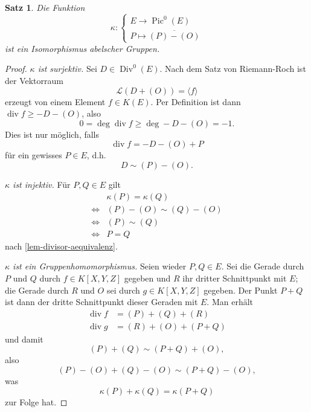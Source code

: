 \documentclass{amsart}
\theoremstyle{plain}
\newtheorem{proposition}[subsection]{Satz}
\theoremstyle{definition}
\newcommand{\pic}{\operatorname{Pic}}
\newcommand{\divgrp}{\operatorname{Div}}
\newcommand{\divop}{\operatorname{div}}
\newcommand{\riemannspace}{\mathcal{L}}
\newcommand{\coset}[1]{\overline{#1}}
\begin{document}
\begin{proposition}
	\label{prop-isomorphism-pic}
	Die Funktion
	\begin{equation*}
		\kappa \colon \begin{cases}
			E \rightarrow \pic^0(E) \\
			P \mapsto \coset{(P) - (O)}
		\end{cases}
	\end{equation*}
	ist ein Isomorphismus abelscher Gruppen.
\end{proposition}
\begin{proof}
	{\it $\kappa$ ist surjektiv.}
	Sei $D \in \divgrp^0(E)$. Nach dem Satz von Riemann-Roch ist der Vektorraum
	\begin{equation*}
		\riemannspace(D + (O)) = \langle f \rangle
	\end{equation*}
	erzeugt von einem Element $f \in K(E)$. Per Definition ist dann $\divop f \geq -D - (O)$, also
	\begin{equation*}
		0 = \deg \divop f \geq \deg -D - (O) = -1.
	\end{equation*}
	Dies ist nur möglich, falls
	\begin{equation*}
		\divop f = -D - (O) + P
	\end{equation*}
	für ein gewisses $P \in E$, d.h.
	\begin{equation*}
		D \sim (P) - (O).
	\end{equation*}

	{\it $\kappa$ ist injektiv.}
	Für $P, Q \in E$ gilt
	\begin{equation*}
		\begin{array}{ll}
			& \kappa(P) = \kappa(Q) \\
			\Leftrightarrow & (P) - (O) \sim (Q) - (O) \\
			\Leftrightarrow & (P) \sim (Q) \\
			\Leftrightarrow & P = Q
		\end{array}
	\end{equation*}
	nach \ref{lem-divisor-aequivalenz}.

	{\it $\kappa$ ist ein Gruppenhomomorphismus.}
	Seien wieder $P, Q \in E$.
	Sei die Gerade durch $P$ und $Q$ durch $f \in K[X, Y, Z]$ gegeben und $R$ ihr dritter Schnittpunkt mit $E$; die Gerade durch $R$ und $O$ sei durch $g \in K[X, Y, Z]$ gegeben.
	Der Punkt $P + Q$ ist dann der dritte Schnittpunkt dieser Geraden mit $E$.
	Man erhält
	\begin{align*}
		\divop f & = (P) + (Q) + (R) \\
		\divop g & = (R) + (O) + (P + Q)
	\end{align*}
	und damit
	\begin{equation*}
		(P) + (Q) \sim (P + Q) + (O),
	\end{equation*}
	also
	\begin{equation*}
		(P) - (O) + (Q) - (O) \sim (P + Q) - (O),
	\end{equation*}
	was
	\begin{equation*}
		\kappa(P) + \kappa(Q) = \kappa(P + Q)
	\end{equation*}
	zur Folge hat.
\end{proof}
\end{document}
